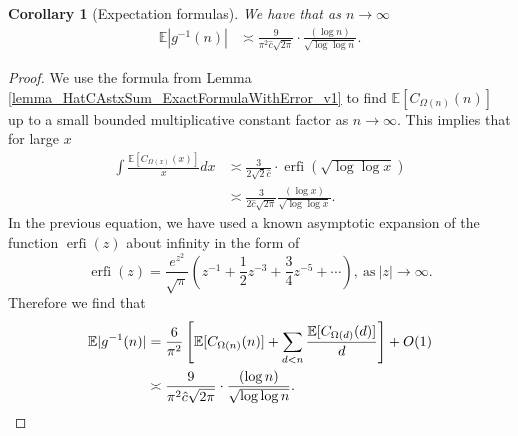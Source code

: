 \documentclass[11pt,reqno,a4letter]{article}
\numberwithin{figure}{section}
\numberwithin{table}{section}
\theoremstyle{plain}
\newtheorem{cor}[theorem]{Corollary}
\numberwithin{theorem}{section}
\theoremstyle{definition}
\begin{document}
\begin{cor}[Expectation formulas] 
\label{cor_ExpectationFormulaAbsgInvn_v2} 
We have that as $n \rightarrow \infty$ 
\begin{align*} 
\mathbb{E}|g^{-1}(n)| & \asymp \frac{9}{\pi^2 \hat{c} \sqrt{2\pi}} \cdot \frac{(\log n)}{\sqrt{\log\log n}}. 
\end{align*} 
\end{cor} 
\begin{proof} 
We use the formula from Lemma \ref{lemma_HatCAstxSum_ExactFormulaWithError_v1} 
to find $\mathbb{E}[C_{\Omega(n)}(n)]$ up to a small bounded multiplicative 
constant factor as $n \rightarrow \infty$.
This implies that for large $x$ 
\begin{align*} 
\int \frac{\mathbb{E}[C_{\Omega(x)}(x)]}{x} dx & \asymp 
     \frac{3}{2\sqrt{2} \hat{c}} \cdot \operatorname{erfi}\left(\sqrt{\log\log x}\right) \\ 
     & \asymp \frac{3}{2\hat{c} \sqrt{2\pi}} \frac{(\log x)}{\sqrt{\log\log x}}. 
\end{align*} 
In the previous equation, we have used a known asymptotic expansion of the function $\operatorname{erfi}(z)$ 
about infinity in the form of \cite[\S 3.2]{INCGAMMA-BOOK} 
\[
\operatorname{erfi}(z) = \frac{e^{z^2}}{\sqrt{\pi}} \left(z^{-1} + \frac{1}{2}z^{-3} + \frac{3}{4}z^{-5} + \cdots \right), 
     \mathrm{\ as\ } |z| \rightarrow \infty. 
\]
Therefore we find that 
\begin{align*} 
\mathbb{E}|g^{-1}(n)| & = \frac{6}{\pi^2}\left[\mathbb{E}[C_{\Omega(n)}(n)] + 
     \sum_{d<n} \frac{\mathbb{E}[C_{\Omega(d)}(d)]}{d}\right] + O(1) \\ 
     & \asymp \frac{9}{\pi^2 \hat{c} \sqrt{2\pi}} \cdot \frac{(\log n)}{\sqrt{\log\log n}}. 
     \qedhere 
\end{align*} 
\end{proof} 
\end{document}
